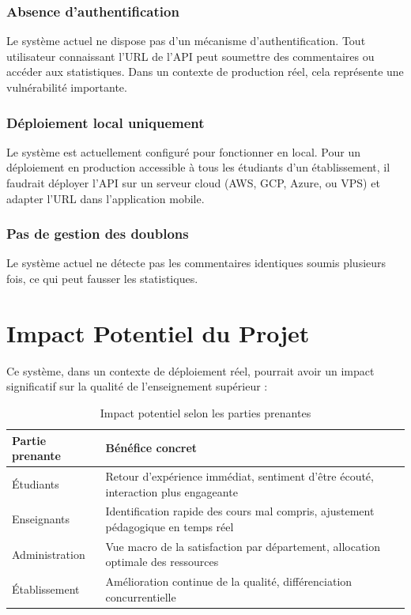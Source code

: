 \subsubsection{Absence d'authentification}

Le système actuel ne dispose pas d'un mécanisme d'authentification.
Tout utilisateur connaissant l'URL de l'API peut soumettre des commentaires
ou accéder aux statistiques. Dans un contexte de production réel, cela
représente une vulnérabilité importante.

\subsubsection{Déploiement local uniquement}

Le système est actuellement configuré pour fonctionner en local. Pour
un déploiement en production accessible à tous les étudiants d'un
établissement, il faudrait déployer l'API sur un serveur cloud (AWS,
GCP, Azure, ou VPS) et adapter l'URL dans l'application mobile.

\subsubsection{Pas de gestion des doublons}

Le système actuel ne détecte pas les commentaires identiques soumis
plusieurs fois, ce qui peut fausser les statistiques.

\section{Impact Potentiel du Projet}

Ce système, dans un contexte de déploiement réel, pourrait avoir un impact
significatif sur la qualité de l'enseignement supérieur :

\begin{table}[H]
\centering
\caption{Impact potentiel selon les parties prenantes}
\label{tab:impact}
\renewcommand{\arraystretch}{1.5}
\begin{tabular}{p{3cm} p{10cm}}
\toprule
\rowcolor{bleuprincipal!15}
\textbf{Partie prenante} & \textbf{Bénéfice concret} \\
\midrule
Étudiants & Retour d'expérience immédiat, sentiment d'être écouté, interaction plus engageante \\
\rowcolor{gray!8}
Enseignants & Identification rapide des cours mal compris, ajustement pédagogique en temps réel \\
Administration & Vue macro de la satisfaction par département, allocation optimale des ressources \\
\rowcolor{gray!8}
Établissement & Amélioration continue de la qualité, différenciation concurrentielle \\
\bottomrule
\end{tabular}
\end{table}


